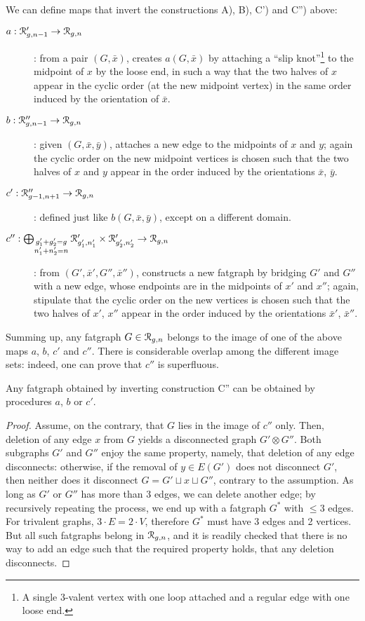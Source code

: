 We can define maps that invert the constructions A), B), C') and C'')
above:
\begin{description}
\item[$a : \mathcal{R}'_{g,n-1} \to \mathcal{R}_{g,n}$]: from a pair $(G, \bar{x})$,
  creates $a(G,\bar{x})$ by attaching a
  ``slip knot''\footnote{A single 3-valent vertex with one loop
    attached and a regular edge with one loose end.} to the midpoint of
  $x$ by the loose end, in such a way that the two halves of $x$
  appear in the cyclic order (at the new midpoint vertex) in the same
  order induced by the orientation of $\bar x$.
\item[$b : \mathcal{R}''_{g,n-1} \to \mathcal{R}_{g,n}$]: given $(G, \bar{x}, \bar{y})$,
  attaches a new edge to the midpoints of $x$ and $y$; again the
  cyclic order on the new midpoint vertices is chosen such that the
  two halves of $x$ and $y$ appear in the order induced by the
  orientations $\bar x$, $\bar y$.
\item[$c': \mathcal{R}''_{g-1,n+1} \to \mathcal{R}_{g,n}$]: defined just like $b(G,
  \bar{x}, \bar{y})$, except on a different domain.
\item[$c'': \bigoplus_{\substack{g'_1+g'_2=g \\ n'_1+n'_2=n}}
  \mathcal{R}'_{g'_1, n'_1} \times \mathcal{R}'_{g'_2, n'_2} \to \mathcal{R}_{g,n}$]: from $(G',
  \bar{x}', G'', \bar{x}'')$, constructs a new fatgraph by bridging
  $G'$ and $G''$ with a new edge, whose endpoints are in the midpoints
  of $x'$ and $x''$; again, stipulate that the cyclic order on the new
  vertices is chosen such that the two halves of $x'$, $x''$ appear in
  the order induced by the orientations $\bar{x}'$, $\bar{x}''$.
\end{description}
Summing up, any fatgraph $G \in \mathcal{R}_{g,n}$ belongs to the image of one
of the above maps $a$, $b$, $c'$ and $c''$. There is considerable
overlap among the different image sets: indeed, one can prove that
$c''$ is superfluous.
\begin{lemma}
  Any fatgraph obtained by inverting construction C'' can be obtained
  by procedures $a$, $b$ or $c'$.
\end{lemma}
\begin{proof}
  Assume, on the contrary, that $G$ lies in the image of $c''$ only.
  Then, deletion of any edge $x$ from $G$ yields a disconnected graph
  $G' \otimes G''$.  Both subgraphs $G'$ and $G''$ enjoy the same
  property, namely, that deletion of any edge disconnects: otherwise,
  if the removal of $y \in E(G')$ does not disconnect $G'$, then
  neither does it disconnect $G = G' \sqcup x \sqcup G''$, contrary to
  the assumption. As long as $G'$ or $G''$ has more than 3 edges, we
  can delete another edge; by recursively repeating the process, we
  end up with a fatgraph $G^*$ with $\leq 3$ edges.  For trivalent
  graphs, $3 \cdot E = 2 \cdot V$, therefore $G^*$ must have 3 edges
  and 2 vertices. But all such fatgraphs belong in $\mathcal{R}_{g,n}$, and it
  is readily checked that there is no way to add an edge such that the
  required property holds, that any deletion disconnects.
\end{proof}

